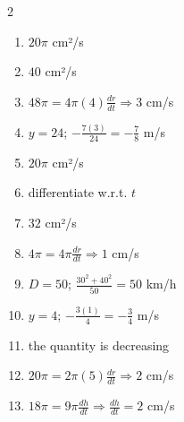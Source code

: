 \documentclass[11pt]{article}
\begin{document}
\begin{keybox}
\begin{multicols}{2}
\small
\begin{enumerate}[leftmargin=*,itemsep=3pt]
  \item $20\pi$ cm²/s
  \item $40$ cm²/s
  \item $48\pi=4\pi(4)\tfrac{dr}{dt}\Rightarrow3$ cm/s
  \item $y=24$; $-\tfrac{7(3)}{24}=-\tfrac78$ m/s
  \item $20\pi$ cm²/s
  \item differentiate w.r.t. $t$
  \item $32$ cm²/s
  \item $4\pi=4\pi\tfrac{dr}{dt}\Rightarrow1$ cm/s
  \item $D=50$; $\tfrac{30^2+40^2}{50}=50$ km/h
  \item $y=4$; $-\tfrac{3(1)}{4}=-\tfrac34$ m/s
  \item the quantity is decreasing
  \item $20\pi=2\pi(5)\tfrac{dr}{dt}\Rightarrow2$ cm/s
  \item $18\pi=9\pi\tfrac{dh}{dt}\Rightarrow\tfrac{dh}{dt}=2$ cm/s
\end{enumerate}
\end{multicols}
\end{keybox}
\end{document}
